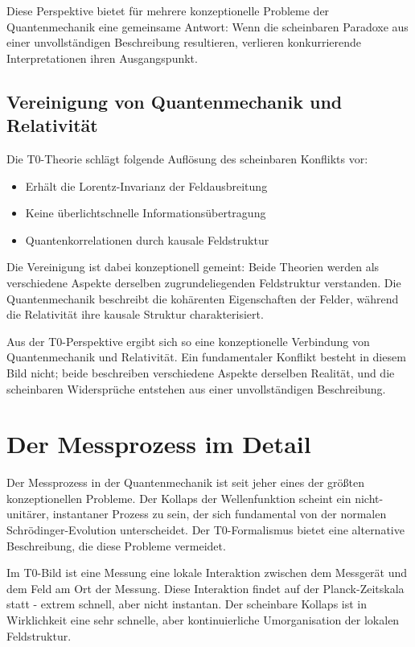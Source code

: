 	Diese Perspektive bietet für mehrere konzeptionelle Probleme der Quantenmechanik eine gemeinsame Antwort: Wenn die scheinbaren Paradoxe aus einer unvollständigen Beschreibung resultieren, verlieren konkurrierende Interpretationen ihren Ausgangspunkt.
	
	\subsection{Vereinigung von Quantenmechanik und Relativität}
	
	Die T0-Theorie schlägt folgende Auflösung des scheinbaren Konflikts vor:
	\begin{itemize}
		\item Erhält die Lorentz-Invarianz der Feldausbreitung
		\item Keine überlichtschnelle Informationsübertragung
		\item Quantenkorrelationen durch kausale Feldstruktur
	\end{itemize}
	
	Die Vereinigung ist dabei konzeptionell gemeint: Beide Theorien werden als verschiedene Aspekte derselben zugrundeliegenden Feldstruktur verstanden. Die Quantenmechanik beschreibt die kohärenten Eigenschaften der Felder, während die Relativität ihre kausale Struktur charakterisiert.
	
	Aus der T0-Perspektive ergibt sich so eine konzeptionelle Verbindung von Quantenmechanik und Relativität. Ein fundamentaler Konflikt besteht in diesem Bild nicht; beide beschreiben verschiedene Aspekte derselben Realität, und die scheinbaren Widersprüche entstehen aus einer unvollständigen Beschreibung.
	
	\section{Der Messprozess im Detail}
	
	Der Messprozess in der Quantenmechanik ist seit jeher eines der größten konzeptionellen Probleme. Der Kollaps der Wellenfunktion scheint ein nicht-unitärer, instantaner Prozess zu sein, der sich fundamental von der normalen Schrödinger-Evolution unterscheidet. Der T0-Formalismus bietet eine alternative Beschreibung, die diese Probleme vermeidet.
	
	Im T0-Bild ist eine Messung eine lokale Interaktion zwischen dem Messgerät und dem Feld am Ort der Messung. Diese Interaktion findet auf der Planck-Zeitskala statt - extrem schnell, aber nicht instantan. Der scheinbare Kollaps ist in Wirklichkeit eine sehr schnelle, aber kontinuierliche Umorganisation der lokalen Feldstruktur.
	
